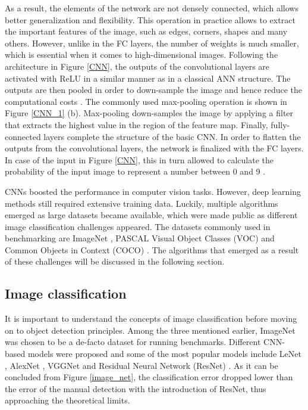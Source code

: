 As a result, the elements of the network  are not densely connected, which allows better generalization and flexibility. This operation in practice allows to extract the important features of the image, such as edges, corners, shapes and many others.  However, unlike in the FC layers, the number of weights is much smaller, which is essential when it comes to high-dimensional images. Following the architecture in Figure \ref{CNN}, the outputs of the convolutional layers are activated with ReLU in a similar manner as in a classical ANN structure. The outputs are then pooled in order to down-sample the image and hence reduce the computational costs \cite{Liu2016}. The commonly used max-pooling operation is shown in Figure \ref{CNN_1} (b). Max-pooling down-samples the image by applying a filter that extracts the highest value in the region of the feature map. Finally, fully-connected layers complete the structure of the basic CNN. In order to flatten the outputs from the convolutional layers, the network is finalized with the FC layers. In case of the input in Figure \ref{CNN}, this in turn allowed to calculate the probability of the input image to represent a number between 0 and 9 \cite{Mahony2019}.

CNNs boosted the performance in computer vision tasks. However, deep learning methods still required extensive training data. Luckily, multiple algorithms emerged as large datasets became available, which were made public as different image classification challenges appeared. The  datasets commonly used in benchmarking are ImageNet \cite{Russakovsky2014}, PASCAL Visual Object Classes (VOC) \cite{Everingham10} and Common Objects in Context (COCO) \cite{Lin2014}. The algorithms that emerged as a result of these challenges will be discussed in the following section. 
\FloatBarrier

\subsection{Image classification}
\label{classification_section} 
It is important to understand the concepts of image classification before moving on to object detection principles. Among the three mentioned earlier, ImageNet was chosen to be a de-facto dataset for running benchmarks.  Different CNN-based models were proposed and some of the most popular models include LeNet \cite{lecun-gradientbased-learning-applied-1998}, AlexNet \cite{NIPS2012_c399862d}, VGGNet \cite{Simonyan2014} and Residual Neural Network (ResNet) \cite{He2015}. As it can be concluded from Figure \ref{image_net}, the classification error dropped lower than the error of the manual detection with the introduction of ResNet, thus approaching the theoretical limits. 

